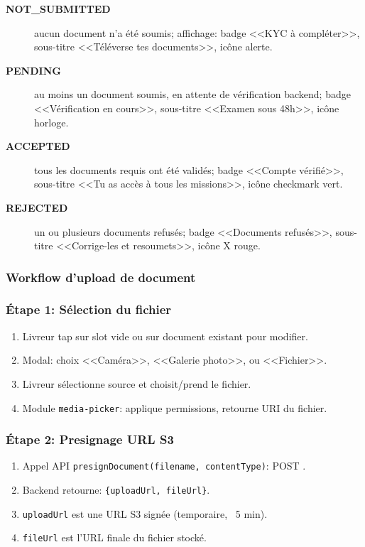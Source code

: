 \begin{description}
    \item[\textbf{NOT\_SUBMITTED}] aucun document n'a été soumis; affichage: badge <<KYC à compléter>>, sous-titre <<Téléverse tes documents>>, icône alerte.
    \item[\textbf{PENDING}] au moins un document soumis, en attente de vérification backend; badge <<Vérification en cours>>, sous-titre <<Examen sous 48h>>, icône horloge.
    \item[\textbf{ACCEPTED}] tous les documents requis ont été validés; badge <<Compte vérifié>>, sous-titre <<Tu as accès à tous les missions>>, icône checkmark vert.
    \item[\textbf{REJECTED}] un ou plusieurs documents refusés; badge <<Documents refusés>>, sous-titre <<Corrige-les et resoumets>>, icône X rouge.
\end{description}

\subsubsection{Workflow d'upload de document}

\subsubsection{Étape 1: Sélection du fichier}

\begin{enumerate}
    \item Livreur tap sur slot vide ou sur document existant pour modifier.
    \item Modal: choix <<Caméra>>, <<Galerie photo>>, ou <<Fichier>>.
    \item Livreur sélectionne source et choisit/prend le fichier.
    \item Module \texttt{media-picker}: applique permissions, retourne URI du fichier.
\end{enumerate}

\subsubsection{Étape 2: Presignage URL S3}

\begin{enumerate}
    \item Appel API \texttt{presignDocument(filename, contentType)}: POST .
    \item Backend retourne: \texttt{\{uploadUrl, fileUrl\}}.
    \item \texttt{uploadUrl} est une URL S3 signée (temporaire, ~5 min).
    \item \texttt{fileUrl} est l'URL finale du fichier stocké.
\end{enumerate}

